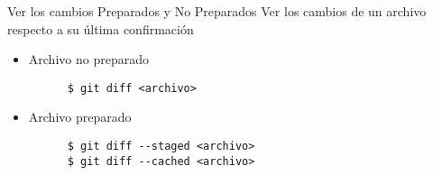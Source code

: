 \begin{frame}[fragile]{Ver los cambios Preparados y No Preparados}
  Ver los cambios de un archivo respecto a su última confirmación
  \begin{itemize}
    \item \alert{Archivo no preparado}
    \begin{verbatim}
      $ git diff <archivo>
    \end{verbatim}
    \item \alert{Archivo preparado}
    \begin{verbatim}
      $ git diff --staged <archivo>
      $ git diff --cached <archivo>
    \end{verbatim}
  \end{itemize}
\end{frame}
